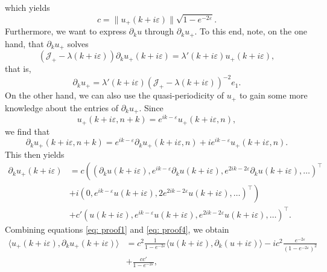 \documentclass[a4paper,reqno,twoside]{amsart}
\numberwithin{equation}{section}
\theoremstyle{definition}
\newcommand{\<}{\ensuremath \leq}
\renewcommand{\>}{\ensuremath \geq}
\renewcommand{\epsilon}{\varepsilon}
\begin{document}
which yields $$c = \lVert u_+(k+i\epsilon)\rVert \sqrt{1- e^{-2\epsilon}}.$$ Furthermore, we want to express $\partial_k u$ through $\partial_k u_+$. To this end, note, on the one hand, that $\partial_ku_+$ solves
\begin{equation}\label{eq: proof2}
    (\mathcal{J}_+-\lambda(k+i\epsilon))\partial_ku_+(k+i\epsilon) = \lambda'(k + i\epsilon)u_+(k +i\epsilon),
\end{equation}
that is,
\begin{equation}\label{eq: proof3}
    \partial_ku_+ = \lambda'(k+i\epsilon)(\mathcal{J}_+-\lambda(k+i\epsilon))^{-2}e_1.
\end{equation}
On the other hand, we can also use the quasi-periodicity of $u_+$ to gain some more knowledge about the entries of $\partial_k u_+$. Since
\begin{equation}
    u_+(k+i\epsilon,n + k ) = e^{ik-\epsilon} u_+(k+i\epsilon,n),
\end{equation}
we find that
\begin{equation}
    \partial_ku_+(k+i\epsilon,n + k ) = e^{ik-\epsilon} \partial_ku_+(k+i\epsilon,n )+i e^{ik-\epsilon} u_+(k+i\epsilon,n).
\end{equation}
This then yields
\begin{equation}\label{eq: proof4}
    \begin{aligned}
        \partial_ku_+(k+i\epsilon) &= c \left(\left(\partial_k u(k + i\epsilon), e^{ik - \epsilon}  \partial_ku(k+i\epsilon), e^{2ik - 2\epsilon} \partial_ku(k+i\epsilon),\dots\right)^\top\right.\\
        &\left.+ i\left(0, e^{ik-\epsilon} u(k+i\epsilon), 2 e^{2ik-2\epsilon} u(k+i\epsilon) ,\dots\right)^\top\right)\\
        &+c' \left(u(k+i\epsilon), e^{ik -\epsilon} u (k+i\epsilon), e^{2ik -2\epsilon} u (k+i\epsilon),\dots\right)^\top.
    \end{aligned}
\end{equation}
Combining equations \eqref{eq: proof1} and \eqref{eq: proof4}, we obtain
\begin{equation} \label{eq:proofn}
    \begin{aligned}
        \langle u_+(k+i\epsilon),\partial_ku_+(k+i\epsilon)\rangle &= c^2\frac{1}{1-e^{-2\epsilon}}\langle u(k + i\epsilon),\partial_k (u+i\epsilon)\rangle  -ic^2\frac{e^{-2\epsilon}}{(1- e^{-2\epsilon})^2}\\
        &+\frac{cc'}{1- e^{-2\epsilon}},
    \end{aligned}
\end{equation}
\end{document}
